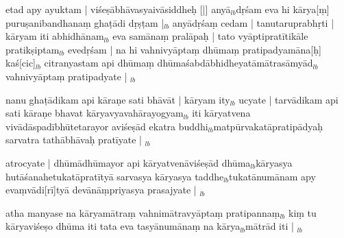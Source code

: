 \documentclass[article,12pt,a4paper]{memoir}%
\newcounter{parCount}
\begin{document}
	  
	  \pstart \leavevmode%
	etad apy ayuktam | viśeṣābhāvasyaivāsiddheḥ [|] anyā{\tiny $_{lb}$}dṛśam eva hi kārya[ṃ] puruṣanibandhanaṃ ghaṭādi dṛṣṭam |{\tiny $_{lb}$} anyādṛśaṃ cedam | tanutaruprabhṛti | kāryam iti abhidhānam{\tiny $_{lb}$} \leavevmode{} eva samānaṃ pralāpaḥ | tato vyāptipratītikāle pratikṣiptam{\tiny $_{lb}$} evedṛśam | na hi vahnivyāptaṃ dhūmaṃ pratipadyamāna[ḥ] kaś[cic]{\tiny $_{lb}$} citranyastam api dhūmaṃ dhūmaśabdābhidheyatāmā\leavevmode{}trasāmyād{\tiny $_{lb}$} vahnivyāptaṃ pratipadyate |
	{}
	\pend%
      {\tiny $_{lb}$}

	  
	  \pstart \leavevmode%
	nanu ghaṭādikam api kāraṇe sati bhāvāt | kāryam ity{\tiny $_{lb}$} ucyate | tarvādikam api sati kāraṇe bhavat kāryavyavahārayogyam{\tiny $_{lb}$} iti kāryatvena vivādāspadībhūtetarayor aviśeṣād ekatra buddhi{\tiny $_{lb}$}matpūrvakatāpratipādyaḥ sarvatra tathābhāvaḥ pratīyate |
	{}
	\pend%
      {\tiny $_{lb}$}

	  
	  \pstart \leavevmode%
	atrocyate | dhūmādhūmayor api kāryatvenāviśeṣād dhūma{\tiny $_{lb}$}kāryasya hutāśanahetukatāpratītyā sarvasya kāryasya taddhe{\tiny $_{lb}$}tukatānumānam apy evaṃvādi[rī]tyā devānāṃpriyasya prasajyate |
	{}
	\pend%
      {\tiny $_{lb}$}

	  
	  \pstart \leavevmode%
	atha manyase na kāryamātraṃ vahnimātravyāptaṃ pratipannaṃ{\tiny $_{lb}$} kiṃ tu kāryaviśeṣo dhūma iti tata eva tasyānumānaṃ na kārya{\tiny $_{lb}$}mātrād iti |
	{}
	\pend%
      {\tiny $_{lb}$}
\end{document}
